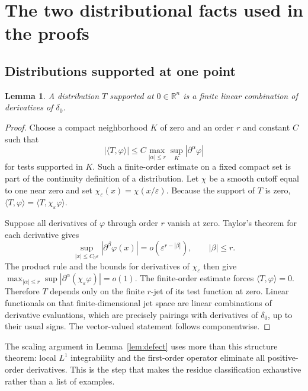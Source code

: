 \documentclass[11pt,a4paper]{article}
\numberwithin{equation}{section}
\newtheorem{lemma}[theorem]{Lemma}
\theoremstyle{definition}
\theoremstyle{remark}
\newcommand{\R}{\mathbb R}
\begin{document}
\appendix
\section{The two distributional facts used in the proofs}
\label{app:distribution}

\subsection{Distributions supported at one point}
\label{app:point}
\begin{lemma}\label{lem:point-support}
A distribution $T$ supported at $0\in\R^n$ is a finite linear
combination of derivatives of $\delta_0$.
\end{lemma}
\begin{proof}
Choose a compact neighborhood $K$ of zero and an order $r$ and constant
$C$ such that
\[
 |\langle T,\varphi\rangle|
 \le C\max_{|\alpha|\le r}\sup_K|\partial^\alpha\varphi|
\]
for tests supported in $K$. Such a finite-order estimate on a fixed
compact set is part of the continuity definition of a distribution.
Let $\chi$ be a smooth cutoff equal to one near zero and set
$\chi_\varepsilon(x)=\chi(x/\varepsilon)$. Because the support of $T$
is zero, $\langle T,\varphi\rangle=
\langle T,\chi_\varepsilon\varphi\rangle$.

Suppose all derivatives of $\varphi$ through order $r$ vanish at zero.
Taylor's theorem for each derivative gives
\[
 \sup_{|x|\le C_0\varepsilon}|\partial^\beta\varphi(x)|
       =o(\varepsilon^{r-|\beta|}),\qquad |\beta|\le r.
\]
The product rule and the bounds for derivatives of
$\chi_\varepsilon$ then give
$\max_{|\alpha|\le r}\sup|
\partial^\alpha(\chi_\varepsilon\varphi)|=o(1)$.
The finite-order estimate forces $\langle T,\varphi\rangle=0$.
Therefore $T$ depends only on the finite $r$-jet of its test function
at zero. Linear functionals on that finite-dimensional jet space are
linear combinations of derivative evaluations, which are precisely
pairings with derivatives of $\delta_0$, up to their usual signs.
The vector-valued statement follows componentwise.
\end{proof}

The scaling argument in Lemma~\ref{lem:defect} uses more than this
structure theorem: local $L^1$ integrability and the first-order
operator eliminate all positive-order derivatives. This is the step
that makes the residue classification exhaustive rather than a list
of examples.
\end{document}
